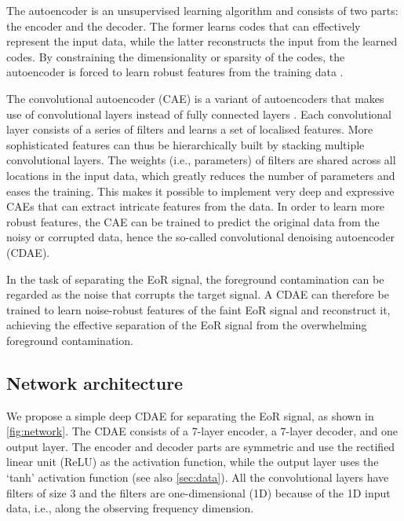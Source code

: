 \documentclass[letters,a4paper,fleqn,usenatbib]{mnras}
\begin{document}
The autoencoder is an unsupervised learning algorithm and consists of
two parts: the encoder and the decoder.
The former learns codes that can effectively represent the input data,
while the latter reconstructs the input from the learned codes.
By constraining the dimensionality or sparsity of the codes, the
autoencoder is forced to learn robust features from the training data
\citep[chapter 14]{goodfellow2016}.

The convolutional autoencoder (CAE) is a variant of autoencoders that
makes use of convolutional layers instead of fully connected layers
\citep{masci2011}.
Each convolutional layer consists of a series of filters and learns
a set of localised features.
More sophisticated features can thus be hierarchically built by stacking
multiple convolutional layers.
The weights (i.e., parameters) of filters are shared across all
locations in the input data, which greatly reduces the number of
parameters and eases the training.
This makes it possible to implement very deep and expressive CAEs that
can extract intricate features from the data.
In order to learn more robust features, the CAE can be trained to
predict the original data from the noisy or corrupted data, hence the
so-called convolutional denoising autoencoder (CDAE).

In the task of separating the EoR signal, the foreground contamination
can be regarded as the noise that corrupts the target signal.
A CDAE can therefore be trained to learn noise-robust features of the
faint EoR signal and reconstruct it, achieving the effective separation
of the EoR signal from the overwhelming foreground contamination.


\subsection{Network architecture}
\label{sec:architecture}

We propose a simple deep CDAE for separating the EoR signal, as shown
in \autoref{fig:network}.
The CDAE consists of a 7-layer encoder, a 7-layer decoder,
and one output layer.
The encoder and decoder parts are symmetric and use the rectified
linear unit (ReLU) as the activation function, while the output layer
uses the `tanh' activation function (see also \autoref{sec:data}).
All the convolutional layers have filters of size 3 and the filters
are one-dimensional (1D) because of the 1D input data, i.e., along the
observing frequency dimension.
\end{document}
